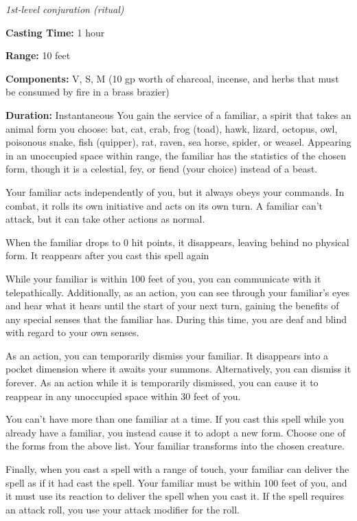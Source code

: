\documentclass[
]{article}
\begin{document}
\emph{1st-level conjuration (ritual)}

\textbf{Casting Time:} 1 hour

\textbf{Range:} 10 feet

\textbf{Components:} V, S, M (10 gp worth of charcoal, incense, and
herbs that must be consumed by fire in a brass brazier)

\textbf{Duration:} Instantaneous You gain the service of a familiar, a
spirit that takes an animal form you choose: bat, cat, crab, frog
(toad), hawk, lizard, octopus, owl, poisonous snake, fish (quipper),
rat, raven, sea horse, spider, or weasel. Appearing in an unoccupied
space within range, the familiar has the statistics of the chosen form,
though it is a celestial, fey, or fiend (your choice) instead of a
beast.

Your familiar acts independently of you, but it always obeys your
commands. In combat, it rolls its own initiative and acts on its own
turn. A familiar can't attack, but it can take other actions as normal.

When the familiar drops to 0 hit points, it disappears, leaving behind
no physical form. It reappears after you cast this spell again

While your familiar is within 100 feet of you, you can communicate with
it telepathically. Additionally, as an action, you can see through your
familiar's eyes and hear what it hears until the start of your next
turn, gaining the benefits of any special senses that the familiar has.
During this time, you are deaf and blind with regard to your own senses.

As an action, you can temporarily dismiss your familiar. It disappears
into a pocket dimension where it awaits your summons. Alternatively, you
can dismiss it forever. As an action while it is temporarily dismissed,
you can cause it to reappear in any unoccupied space within 30 feet of
you.

You can't have more than one familiar at a time. If you cast this spell
while you already have a familiar, you instead cause it to adopt a new
form. Choose one of the forms from the above list. Your familiar
transforms into the chosen creature.

Finally, when you cast a spell with a range of touch, your familiar can
deliver the spell as if it had cast the spell. Your familiar must be
within 100 feet of you, and it must use its reaction to deliver the
spell when you cast it. If the spell requires an attack roll, you use
your attack modifier for the roll.
\end{document}
